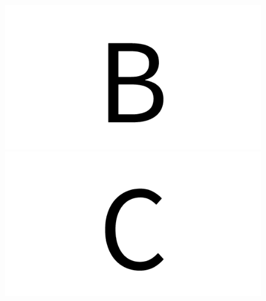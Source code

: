 \documentclass{article}
\begin{document}
\clearpage

\begin{figure}[H]
  \includegraphics[width=\linewidth]{u_B}
\endminipage\hfill
{}
  \includegraphics[width=\linewidth]{u_C}
\endminipage\hfill
\end{figure}
\end{document}
